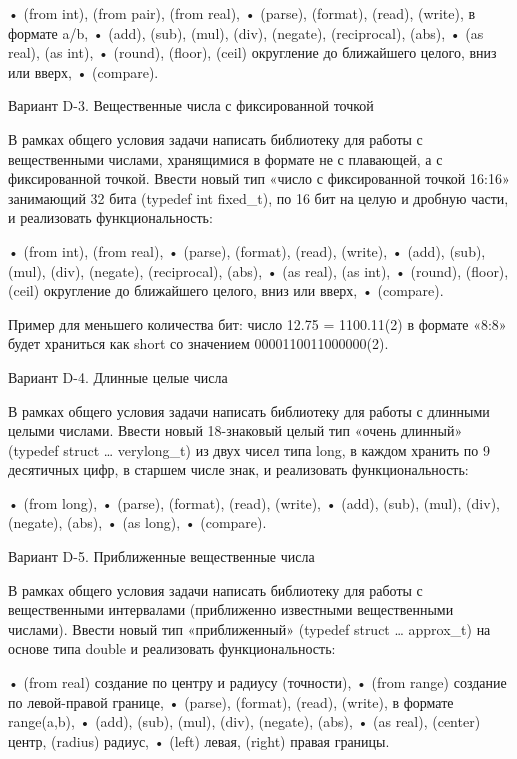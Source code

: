 •	(from int), (from pair), (from real),
•	(parse), (format), (read), (write), в формате a/b,
•	(add), (sub), (mul), (div), (negate), (reciprocal), (abs),
•	(as real), (as int),
•	(round), (floor), (ceil) округление до ближайшего целого, вниз или вверх,
•	(compare).


Вариант D-3. Вещественные числа с фиксированной точкой

В рамках общего условия задачи написать библиотеку для работы с вещественными
числами, хранящимися в формате не с плавающей, а с фиксированной точкой.
Ввести новый тип «число с фиксированной точкой 16:16» занимающий 32 бита
(typedef int fixed_t), по 16 бит на целую и дробную части, и реализовать
функциональность:

•	(from int), (from real),
•	(parse), (format), (read), (write),
•	(add), (sub), (mul), (div), (negate), (reciprocal), (abs),
•	(as real), (as int),
•	(round), (floor), (ceil) округление до ближайшего целого, вниз или вверх,
•	(compare).

Пример для меньшего количества бит: число 12.75 = 1100.11(2) в формате «8:8»
будет храниться как short со значением 0000110011000000(2).


Вариант D-4. Длинные целые числа

В рамках общего условия задачи написать библиотеку для работы с длинными
целыми числами. Ввести новый 18-знаковый целый тип «очень длинный» (typedef
struct … verylong_t) из двух чисел типа long, в каждом хранить по 9 десятичных
цифр, в старшем числе знак, и реализовать функциональность:

•	(from long),
•	(parse), (format), (read), (write),
•	(add), (sub), (mul), (div), (negate), (abs),
•	(as long),
•	(compare).


Вариант D-5. Приближенные вещественные числа

В рамках общего условия задачи написать библиотеку для работы с вещественными
интервалами (приближенно известными вещественными числами). Ввести новый тип
«приближенный» (typedef struct … approx_t) на основе типа double и реализовать
функциональность:

•	(from real) создание по центру и радиусу (точности),
•	(from range) создание по левой-правой границе,
•	(parse), (format), (read), (write), в формате range(a,b),
•	(add), (sub), (mul), (div), (negate), (abs),
•	(as real), (center) центр, (radius) радиус,
•	(left) левая, (right) правая границы.

